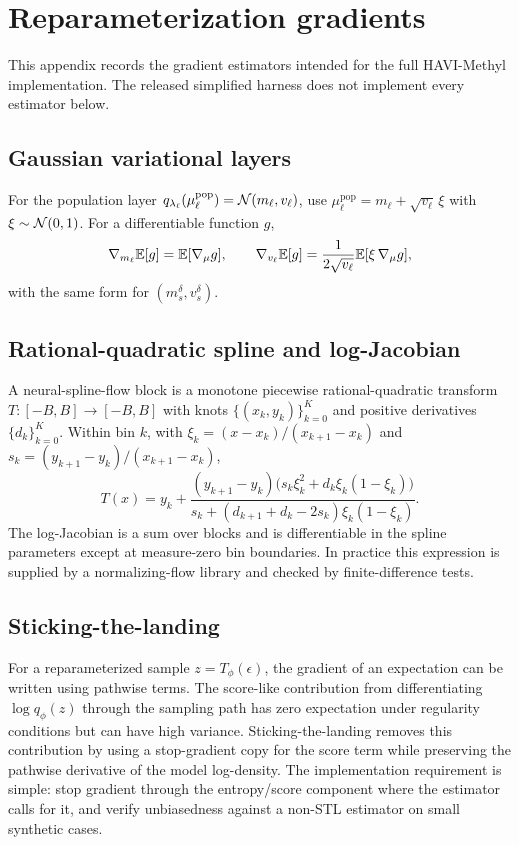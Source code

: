 \section{Reparameterization gradients}
\label{app:reparam}

This appendix records the gradient estimators intended for the full HAVI-Methyl implementation. The released simplified harness does not implement every estimator below.

\subsection*{Gaussian variational layers}
For the population layer $q_{\lambda_\ell}(\mu^{\mathrm{pop}}_\ell)=\mathcal{N}(m_\ell,v_\ell)$, use $\mu^{\mathrm{pop}}_\ell=m_\ell+\sqrt{v_\ell}\,\xi$ with $\xi\sim\mathcal{N}(0,1)$. For a differentiable function $g$,
\begin{equation}
\nabla_{m_\ell}\mathbb{E}[g]=\mathbb{E}[\nabla_{\mu}g],\qquad
\nabla_{v_\ell}\mathbb{E}[g]=\frac{1}{2\sqrt{v_\ell}}\mathbb{E}[\xi\,\nabla_{\mu}g],
\end{equation}
with the same form for $(m_s^\delta,v_s^\delta)$.

\subsection*{Rational-quadratic spline and log-Jacobian}
A neural-spline-flow block \citep{durkan2019nsf} is a monotone piecewise rational-quadratic transform $T:[-B,B]\to[-B,B]$ with knots $\{(x_k,y_k)\}_{k=0}^K$ and positive derivatives $\{d_k\}_{k=0}^K$. Within bin $k$, with $\xi_k=(x-x_k)/(x_{k+1}-x_k)$ and $s_k=(y_{k+1}-y_k)/(x_{k+1}-x_k)$,
\begin{equation}
T(x) = y_k + \frac{(y_{k+1}-y_k)\big(s_k\xi_k^2+d_k\xi_k(1-\xi_k)\big)}{s_k+(d_{k+1}+d_k-2s_k)\xi_k(1-\xi_k)}.
\end{equation}
The log-Jacobian is a sum over blocks and is differentiable in the spline parameters except at measure-zero bin boundaries. In practice this expression is supplied by a normalizing-flow library and checked by finite-difference tests.

\subsection*{Sticking-the-landing}
For a reparameterized sample $z=T_\phi(\epsilon)$, the gradient of an expectation can be written using pathwise terms. The score-like contribution from differentiating $\log q_\phi(z)$ through the sampling path has zero expectation under regularity conditions but can have high variance. Sticking-the-landing \citep{roeder2017stl} removes this contribution by using a stop-gradient copy for the score term while preserving the pathwise derivative of the model log-density. The implementation requirement is simple: stop gradient through the entropy/score component where the estimator calls for it, and verify unbiasedness against a non-STL estimator on small synthetic cases.

